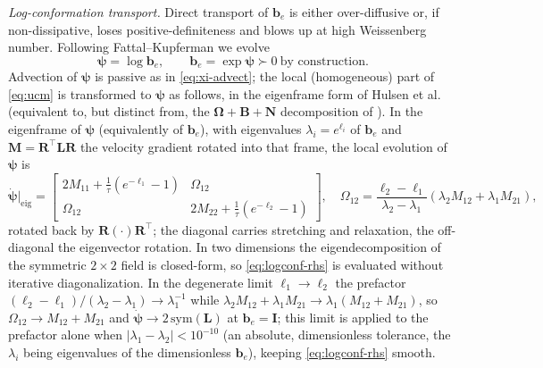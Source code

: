 \documentclass[final,3p,times]{elsarticle}
\theoremstyle{remark}
\newcommand{\be}{\bm{b}_e}              %
\newcommand{\Lt}{\bm{L}}                %
\newcommand{\It}{\bm{I}}                %
\newcommand{\psib}{\bm{\psi}}           %
\begin{document}
\emph{Log-conformation transport.}
Direct transport of $\be$ is either over-diffusive or, if non-dissipative, loses
positive-definiteness and blows up at high Weissenberg number. Following
Fattal--Kupferman \cite{Fattal2004} we evolve
\begin{equation}
\psib=\log\be, \qquad \be=\exp\psib\succ0\ \text{by construction.}
\label{eq:psi}
\end{equation}
Advection of $\psib$ is passive as in \cref{eq:xi-advect}; the local (homogeneous) part
of \cref{eq:ucm} is transformed to $\psib$ as follows, in the eigenframe form of Hulsen
et al.\ \cite{Hulsen2005} (equivalent to, but distinct from, the
$\bm\Omega+\bm B+\bm N$ decomposition of \cite{Fattal2004}). In the eigenframe of $\psib$
(equivalently of $\be$), with eigenvalues $\lambda_i=e^{\ell_i}$ of $\be$ and
$\bm M=\bm R^{\!\top}\Lt\bm R$ the velocity gradient rotated into that frame, the local
evolution of $\psib$ is
\begin{equation}
\dot{\psib}\big|_{\mathrm{eig}}
   = \begin{bmatrix} 2M_{11} + \tfrac1\tau(e^{-\ell_1}-1) & \Omega_{12}\\[2pt]
       \Omega_{12} & 2M_{22} + \tfrac1\tau(e^{-\ell_2}-1)\end{bmatrix},
\quad
\Omega_{12}=\frac{\ell_2-\ell_1}{\lambda_2-\lambda_1}\left(\lambda_2 M_{12}+\lambda_1 M_{21}\right),
\label{eq:logconf-rhs}
\end{equation}
rotated back by $\bm R(\cdot)\bm R^{\!\top}$; the diagonal carries stretching and
relaxation, the off-diagonal the eigenvector rotation. In two dimensions the eigendecomposition of
the symmetric $2\times2$ field is closed-form, so \cref{eq:logconf-rhs} is evaluated without
iterative diagonalization. In the degenerate limit $\ell_1\!\to\!\ell_2$ the prefactor
$(\ell_2-\ell_1)/(\lambda_2-\lambda_1)\to\lambda_1^{-1}$ while
$\lambda_2 M_{12}+\lambda_1 M_{21}\to\lambda_1(M_{12}+M_{21})$, so $\Omega_{12}\to M_{12}+M_{21}$ and
$\dot{\psib}\to2\,\mathrm{sym}(\Lt)$ at $\be=\It$; this limit is applied to the prefactor
alone when $|\lambda_1-\lambda_2|<10^{-10}$ (an absolute, dimensionless tolerance, the $\lambda_i$
being eigenvalues of the dimensionless $\be$), keeping \cref{eq:logconf-rhs} smooth.
\end{document}
